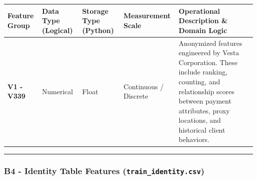 \documentclass[11pt]{article}
\begin{document}
{\def\LTcaptype{none} %
\begin{longtable}[]{@{}
  >{\raggedright\arraybackslash}p{}
  >{\raggedright\arraybackslash}p{}
  >{\raggedright\arraybackslash}p{}
  >{\raggedright\arraybackslash}p{}
  >{\raggedright\arraybackslash}p{}@{}}
\toprule\noalign{}
\begin{minipage}[b]{\linewidth}\raggedright
Feature Group
\end{minipage} & \begin{minipage}[b]{\linewidth}\raggedright
Data Type (Logical)
\end{minipage} & \begin{minipage}[b]{\linewidth}\raggedright
Storage Type (Python)
\end{minipage} & \begin{minipage}[b]{\linewidth}\raggedright
Measurement Scale
\end{minipage} & \begin{minipage}[b]{\linewidth}\raggedright
Operational Description \& Domain Logic
\end{minipage} \\
\midrule\noalign{}
\endhead
\bottomrule\noalign{}
\endlastfoot
\textbf{V1 - V339} & Numerical & Float & Continuous / Discrete &
Anonymized features engineered by Vesta Corporation. These include
ranking, counting, and relationship scores between payment attributes,
proxy locations, and historical client behaviors. \\
\end{longtable}
}

\begin{center}\rule{0.5\linewidth}{0.5pt}\end{center}

\subsubsection{\texorpdfstring{B4 - Identity Table Features
(\texttt{train\_identity.csv})}{B4 - Identity Table Features (train\_identity.csv)}}\label{b4---identity-table-features-train_identity.csv}
\end{document}
